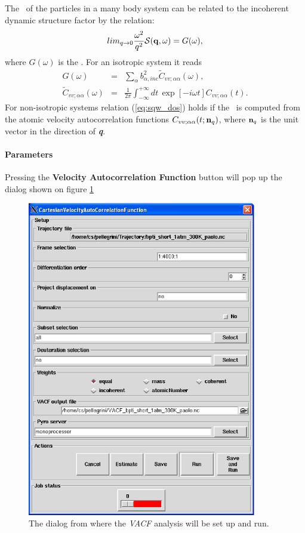 \documentclass[a4paper,11pt]{report}
\begin{document}
The \VACF\ of the particles in a many body system can be related to the
incoherent dynamic structure factor by the relation:
\begin{equation}
\label{eq:sqw_dos}
lim_{q\to 0} \frac{\omega^2}{q^2}{\cal S}({\bf q},\omega) =
G(\omega), 
\end{equation}
where $G(\omega)$ is the \DOS. For an isotropic system it reads
\begin{eqnarray}
\label{eq:dos}
G(\omega) &= &\sum_{\alpha}b^2_{\alpha,inc}
\tilde C_{vv ; \alpha\alpha}(\omega),\\
\label{eq:dos_alpha}
\tilde C_{vv ; \alpha\alpha}(\omega) &= &
\frac{1}{2\pi}\int_{-\infty}^{+\infty}dt\, \exp[-i\omega t] 
C_{vv ; \alpha\alpha}(t).
\end{eqnarray}
For non-isotropic systems relation (\ref{eq:sqw_dos}) holds if the \DOS\ is computed from the atomic velocity 
autocorrelation functions $C_{vv ; \alpha\alpha}(t;{\bf n}_q)$, where ${\bf n}_q$ is the unit vector in the 
direction of \textit{\textbf{q}}.

\paragraph{Parameters\\}
\label{vacf_parameters}
Pressing the \textbf{Velocity Autocorrelation Function} button will pop up the dialog shown on figure \ref{fig:vacf}
\begin{figure}[h!]
\begin{center}
\includegraphics[width=10cm]{Figures/vacf.eps}
\end{center}
\caption[The \textit{VACF} analysis dialog]{The dialog from where the \textit{VACF} analysis will be set up and run.}
\label{fig:vacf}
\end{figure}   
\end{document}
